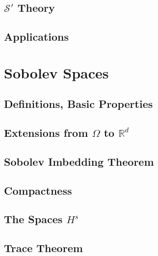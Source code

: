 \documentclass[letterpaper,twoside,12pt]{article}
\theoremstyle{mystyle}
\newcommand{\R}{{\mathbb R}}
\newcommand{\ScS}{\mathcal S}
\begin{document}
\subsection{$\ScS'$ Theory}

\subsection{Applications}











































\newpage\section{Sobolev Spaces}
\subsection{Definitions, Basic Properties}
\subsection{Extensions from $\Omega$ to $\R^d$}
\subsection{Sobolev Imbedding Theorem}
\subsection{Compactness}
\subsection{The Spaces $H^s$}
\subsection{Trace Theorem}
\end{document}
